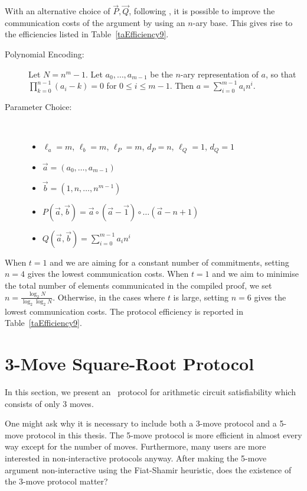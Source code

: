 With an alternative choice of $\vec{P},\vec{Q}$, following \cite{Chaabouni2010}, it is possible to improve the communication costs of the argument by using an $n$-ary base. This gives rise to the efficiencies listed in Table~\ref{taEfficiency9}.
\begin{description}
\item[ Polynomial Encoding: ] Let $N=n^m-1$. Let $a_0,\ldots,a_{m-1}$ be the $n$-ary representation of $a$, so that $\prod_{k=0}^{n-1} (a_i - k) = 0$ for $0 \leq i \leq m-1$. Then $a = \sum_{i=0}^{m-1} a_i n^i$.
\item[ Parameter Choice: ] \ 
\begin{itemize}
\item $\ell_a=m$, $\ell_b=m$, $\ell_P=m$, $d_P=n$, $\ell_Q=1$, $d_Q=1$ 
\item $\vec{a} = (a_0,\ldots,a_{m-1})$
\item $\vec{b} = (1,n,\ldots,n^{m-1})$
\item $P(\vec{a},\vec{b}) = \vec{a} \circ ( \vec{a}-\vec{1} ) \circ \ldots ( \vec{a} - n+1 ) $
\item $Q(\vec{a},\vec{b}) = \sum_{i=0}^{m-1} a_i n^i$
\end{itemize}
\end{description}

When $t=1$ and we are aiming for a constant number of commitments, setting $n=4$ gives the lowest communication costs. When $t=1$ and we aim to minimise the total number of elements communicated in the compiled proof, we set $n = \frac{\log_2N}{\log_2 \log_2 N}$. Otherwise, in the cases where $t$ is large, setting $n=6$ gives the lowest communication costs. The protocol efficiency is reported in Table~\ref{taEfficiency9}.

\section{3-Move Square-Root Protocol} \label{subsec:3rndsqrt}

In this section, we present an \ILC\ protocol for arithmetic circuit satisfiability which consists of only 3 moves.

One might ask why it is necessary to include both a 3-move protocol and a 5-move protocol in this thesis. The 5-move protocol is more efficient in almost every way except for the number of moves. Furthermore, many users are more interested in non-interactive protocols anyway. After making the 5-move argument non-interactive using the Fiat-Shamir heuristic, does the existence of the 3-move protocol matter?

